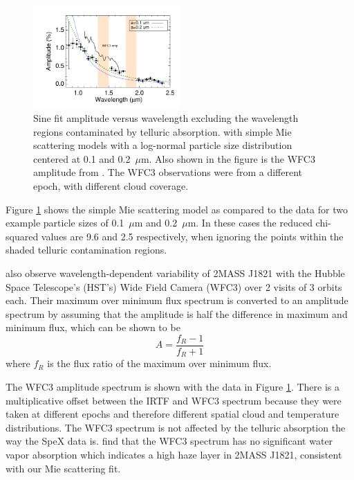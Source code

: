 \documentclass[twocolumn]{aastex6}
\begin{document}
\begin{figure}
\begin{centering}
\includegraphics[width=0.5\textwidth]{amp_vs_wavl_j1821_mie_sc.pdf}
\caption{Sine fit amplitude versus wavelength excluding the wavelength regions contaminated by telluric absorption. with simple Mie scattering models with a log-normal particle size distribution centered at 0.1 and 0.2~$\mu$m. Also shown in the figure is the WFC3 amplitude from \citet{yang2015hstRotBD}. The WFC3 observations were from a different epoch, with different cloud coverage.}\label{fig:ampspec1821mie}
\end{centering}
\end{figure}

Figure \ref{fig:ampspec1821mie} shows the simple Mie scattering model as compared to the data for two example particle sizes of 0.1~$\mu$m and 0.2~$\mu$m.
In these cases the reduced chi-squared values are 9.6 and 2.5 respectively, when ignoring the points within the shaded telluric contamination regions.

\citet{yang2015hstRotBD} also observe wavelength-dependent variability of 2MASS J1821 with the Hubble Space Telescope's (HST's) Wide Field Camera (WFC3) over 2 visits of 3 orbits each.
Their maximum over minimum flux spectrum is converted to an amplitude spectrum by assuming that the amplitude is half the difference in maximum and minimum flux, which can be shown to be 
\begin{equation}
A  = \frac{f_R - 1}{f_R + 1}
\end{equation}\label{eq:ampFromRatio}
where $f_R$ is the flux ratio of the maximum over minimum flux.

The WFC3 amplitude spectrum is shown with the data in Figure \ref{fig:ampspec1821mie}.
There is a multiplicative offset between the IRTF and WFC3 spectrum because they were taken at different epochs and therefore different spatial cloud and temperature distributions.
The WFC3 spectrum is not affected by the telluric absorption the way the SpeX data is.
\citet{yang2015hstRotBD} find that the WFC3 spectrum has no significant water vapor absorption which indicates a high haze layer in 2MASS J1821, consistent with our Mie scattering fit.
\end{document}
